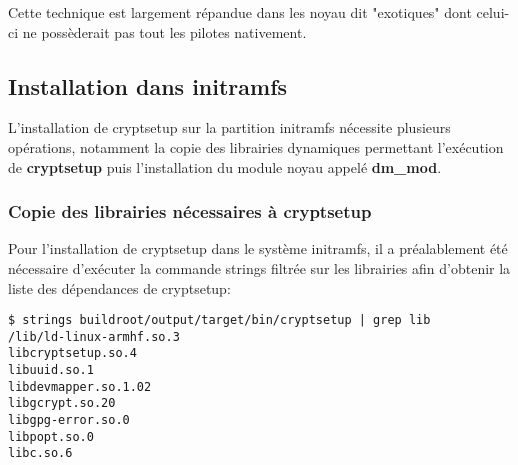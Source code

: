 Cette technique est largement répandue dans les noyau dit "exotiques" dont celui-ci ne possèderait pas tout les pilotes nativement.

\subsection{Installation dans initramfs}
L'installation de cryptsetup sur la partition initramfs nécessite plusieurs opérations, notamment la copie des librairies dynamiques permettant l'exécution de \textbf{cryptsetup} puis l'installation du module noyau appelé \textbf{dm\_mod}.

\subsubsection{Copie des librairies nécessaires à cryptsetup}
Pour l'installation de cryptsetup dans le système initramfs, il a préalablement été nécessaire d'exécuter la commande strings filtrée sur les librairies afin d'obtenir la liste des dépendances de cryptsetup:
\begin{lstlisting}[style=Bash]
$ strings buildroot/output/target/bin/cryptsetup | grep lib
/lib/ld-linux-armhf.so.3
libcryptsetup.so.4
libuuid.so.1
libdevmapper.so.1.02
libgcrypt.so.20
libgpg-error.so.0
libpopt.so.0
libc.so.6
\end{lstlisting}

